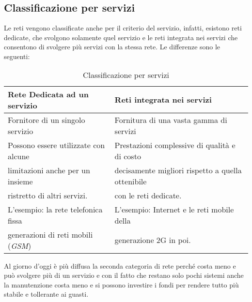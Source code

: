 \subsection{Classificazione per servizi}
\label{sec:classperservizi}
Le reti vengono classificate anche per il criterio del servizio, infatti, esistono
reti dedicate, che svolgono solamente quel servizio e le reti integrata nei servizi
che consentono di svolgere più servizi con la stessa rete. Le differenze sono le
seguenti:
\begin{table}[ht]
  \centering
  \begin{tabular}{ll}
    Rete \textbf{Dedicata} ad un servizio & Reti \textbf{integrata nei servizi}\\\hline
    Fornitore di un singolo servizio & Fornitura di una vasta gamma di servizi\\\hline
    Possono essere utilizzate con alcune & Prestazioni complessive di qualità e di costo\\
    limitazioni anche per un insieme & decisamente migliori rispetto a quella ottenibile\\
    ristretto di altri servizi. & con le reti dedicate.\\\hline

    L'esempio: la rete telefonica fissa & L'esempio: Internet e le reti mobile della\\
    generazioni di reti mobili ({\it GSM}) & generazione 2G in poi.\\\hline
  \end{tabular}
  \caption{Classificazione per servizi}
  \label{tab:classperserv}
\end{table}
\begin{oss}
  Al giorno d'oggi è più diffusa la seconda categoria di rete perché costa meno e può
  svolgere più di un servizio e con il fatto che restano solo pochi sistemi anche la
  manutenzione costa meno e si possono investire i fondi per rendere tutto più stabile e
  tollerante ai guasti.
\end{oss}
